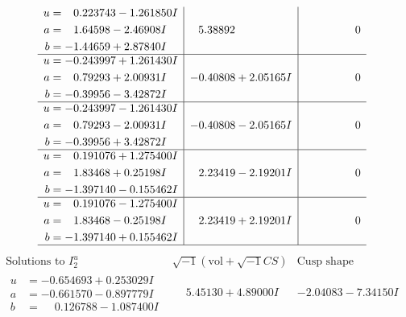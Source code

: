 \documentclass[1p]{elsarticle_modified}
\theoremstyle{definition}
\newcommand{\I}{\sqrt{-1}}
\begin{document}
$$\begin{array}{c|c|c}
\begin{aligned}
u &= \phantom{-}0.223743 - 1.261850 I \\
a &= \phantom{-}1.64598 - 2.46908 I \\
b &= -1.44659 + 2.87840 I\end{aligned}
 & \phantom{-}5.38892\phantom{ +0.000000I} & \phantom{-0.000000 } 0 \\ \hline\begin{aligned}
u &= -0.243997 + 1.261430 I \\
a &= \phantom{-}0.79293 + 2.00931 I \\
b &= -0.39956 - 3.42872 I\end{aligned}
 & -0.40808 + 2.05165 I & \phantom{-0.000000 } 0 \\ \hline\begin{aligned}
u &= -0.243997 - 1.261430 I \\
a &= \phantom{-}0.79293 - 2.00931 I \\
b &= -0.39956 + 3.42872 I\end{aligned}
 & -0.40808 - 2.05165 I & \phantom{-0.000000 } 0 \\ \hline\begin{aligned}
u &= \phantom{-}0.191076 + 1.275400 I \\
a &= \phantom{-}1.83468 + 0.25198 I \\
b &= -1.397140 - 0.155462 I\end{aligned}
 & \phantom{-}2.23419 - 2.19201 I & \phantom{-0.000000 } 0 \\ \hline\begin{aligned}
u &= \phantom{-}0.191076 - 1.275400 I \\
a &= \phantom{-}1.83468 - 0.25198 I \\
b &= -1.397140 + 0.155462 I\end{aligned}
 & \phantom{-}2.23419 + 2.19201 I & \phantom{-0.000000 } 0\\
 \hline 
 \end{array}$$\newpage$$\begin{array}{c|c|c}  
\text{Solutions to }I^u_{2}& \I (\text{vol} + \sqrt{-1}CS) & \text{Cusp shape}\\
 \hline 
\begin{aligned}
u &= -0.654693 + 0.253029 I \\
a &= -0.661570 - 0.897779 I \\
b &= \phantom{-}0.126788 - 1.087400 I\end{aligned}
 & \phantom{-}5.45130 + 4.89000 I & -2.04083 - 7.34150 I \\ \hline\begin{aligned}

\end{aligned}
\end{array}$$
\end{document}
